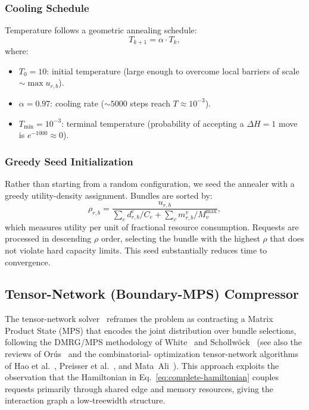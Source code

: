 \documentclass[10pt,a4paper]{article}
\begin{document}
\subsubsection{Cooling Schedule}

Temperature follows a geometric annealing schedule:
\begin{equation}
  T_{k+1} = \alpha \cdot T_k,
\label{eq:cooling}
\end{equation}
where:
\begin{itemize}
  \item $T_0 = 10$: initial temperature (large enough to overcome
    local barriers of scale $\sim \max u_{r,b}$).
  \item $\alpha = 0.97$: cooling rate ($\sim 5000$ steps reach
    $T \approx 10^{-3}$).
  \item $T_{\min} = 10^{-3}$: terminal temperature (probability of
    accepting a $\Delta H = 1$ move is $e^{-1000} \approx 0$).
\end{itemize}

\subsubsection{Greedy Seed Initialization}

Rather than starting from a random configuration, we seed the
annealer with a greedy utility-density assignment.  Bundles are
sorted by:
\begin{equation}
  \rho_{r,b} = \frac{u_{r,b}}{\sum_e d_{r,b}^e / C_e
    + \sum_v m_{r,b}^v / M_v^{\max}},
\end{equation}
which measures utility per unit of fractional resource consumption.
Requests are processed in descending $\rho$ order, selecting the
bundle with the highest $\rho$ that does not violate hard capacity
limits.  This seed substantially reduces time to convergence.

\subsection{Tensor-Network (Boundary-MPS) Compressor}
\label{sec:tn}

The tensor-network solver~\cite{rosales2025quantum} reframes the
problem as contracting a Matrix Product State (MPS) that encodes
the joint distribution over bundle selections, following the
DMRG/MPS methodology of White~\cite{white1992dmrg} and
Schollw\"ock~\cite{schollwock2011dmrg} (see also the reviews of
Or\'us~\cite{orus2014practical,orus2019tensor} and the combinatorial-
optimization tensor-network algorithms of
Hao et al.~\cite{hao2022quantum}, Preisser et al.~\cite{preisser2026variational},
and Mata~Ali~\cite{mata2025explicit,mata2023polynomial}).  This approach
exploits the observation that the Hamiltonian in
Eq.~\eqref{eq:complete-hamiltonian} couples requests primarily
through shared edge and memory resources, giving the interaction
graph a low-treewidth structure.
\end{document}
